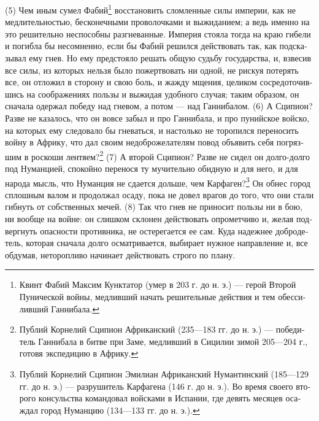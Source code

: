 (5) Чем иным сумел Фабий\footnote{Квинт Фабий Мак­сим Кунк­та­тор (умер в 203 г. до н. э.) — герой Вто­рой Пуни­че­ской вой­ны, мед­лив­ший начать реши­тель­ные дей­ст­вия и тем обес­си­лив­ший Ган­ни­ба­ла.} вос­ста­но­вить слом­лен­ные силы импе­рии, как не мед­ли­тель­но­стью, бес­ко­неч­ны­ми про­во­лоч­ка­ми и выжида­ни­ем; а ведь имен­но на это реши­тель­но неспо­соб­ны раз­гне­ван­ные. Импе­рия сто­я­ла тогда на краю гибе­ли и погиб­ла бы несо­мнен­но, если бы Фабий решил­ся дей­ст­во­вать так, как под­ска­зы­вал ему гнев. Но ему пред­сто­я­ло решать общую судь­бу государ­ства, и, взве­сив все силы, из кото­рых нель­зя было пожерт­во­вать ни одной, не рискуя поте­рять все, он отло­жил в сто­ро­ну и свою боль, и жаж­ду мще­ния, цели­ком сосре­дото­чив­шись на сооб­ра­же­ни­ях поль­зы и выжидая удоб­но­го слу­чая; таким обра­зом, он сна­ча­ла одер­жал победу над гне­вом, а потом --- над Ган­ни­ба­лом. (6) А Сци­пи­он? Раз­ве не каза­лось, что он вовсе забыл и про Ган­ни­ба­ла, и про пуний­ское вой­ско, на кото­рых ему сле­до­ва­ло бы гне­вать­ся, и настоль­ко не торо­пил­ся пере­но­сить вой­ну в Афри­ку, что дал сво­им недоб­ро­же­ла­те­лям повод объ­явить себя погряз­шим в рос­ко­ши лен­тя­ем?\footnote{Пуб­лий Кор­не­лий Сци­пи­он Афри­кан­ский (235—183 гг. до н. э.) — победи­тель Ган­ни­ба­ла в бит­ве при Заме, мед­лив­ший в Сици­лии зимой 205—204 г., гото­вя экс­пе­ди­цию в Афри­ку.} (7) А вто­рой Сци­пи­он? Раз­ве не сидел он дол­го-дол­го под Нуман­ци­ей, спо­кой­но пере­но­ся ту мучи­тель­но обид­ную и для него, и для наро­да мысль, что Нуман­ция не сда­ет­ся доль­ше, чем Кар­фа­ген?\footnote{Пуб­лий Кор­не­лий Сци­пи­он Эми­ли­ан Афри­кан­ский Нуман­тин­ский (185—129 гг. до н. э.) — раз­ру­ши­тель Кар­фа­ге­на (146 г. до н. э.). Во вре­мя сво­его вто­ро­го кон­суль­ства коман­до­вал вой­ска­ми в Испа­нии, где девять меся­цев оса­ждал город Нуман­цию (134—133 гг. до н. э.).} Он обнес город сплош­ным валом и про­дол­жал оса­ду, пока не довел вра­гов до того, что они ста­ли гиб­нуть от соб­ст­вен­ных мечей. (8) Так что гнев не при­но­сит поль­зы ни в бою, ни вооб­ще на войне: он слиш­ком скло­нен дей­ст­во­вать опро­мет­чи­во и, желая под­верг­нуть опас­но­сти про­тив­ни­ка, не осте­ре­га­ет­ся ее сам. Куда надеж­нее доб­ро­де­тель, кото­рая сна­ча­ла дол­го осмат­ри­ва­ет­ся, выби­ра­ет нуж­ное направ­ле­ние и, все обду­мав, нето­роп­ли­во начи­на­ет дей­ст­во­вать стро­го по пла­ну.

